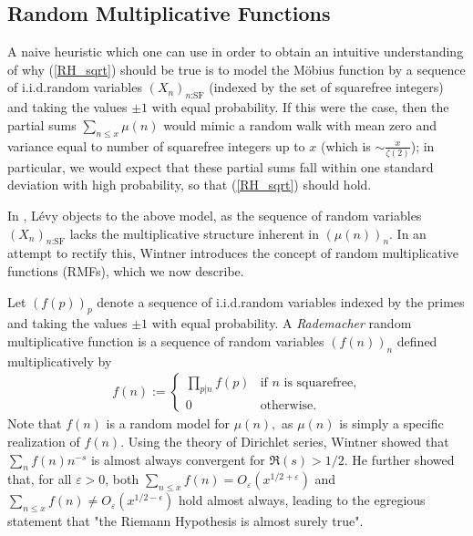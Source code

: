 \documentclass[11pts]{amsart}
\numberwithin{equation}{section}
\begin{document}

\subsection{Random Multiplicative Functions}

A naive heuristic which one can use in order to obtain an intuitive understanding of why (\ref{RH_sqrt}) should be true is to model the M{\"o}bius function by a sequence of i.i.d.\;random variables $(X_n)_{\text{$n$:SF}}$ (indexed by the set of squarefree integers) and taking the values $\pm 1$ with equal probability. If this were the case, then the partial sums $\sum_{n\leq x}\mu(n)$ would mimic a random walk with mean zero and variance equal to number of squarefree integers up to $x$ (which is $\sim \frac{x}{\zeta(2)}$); in particular, we would expect that these partial sums fall within one standard deviation with high probability, so that (\ref{RH_sqrt}) should hold. 

In \cite{Levy}, L{\'e}vy objects to the above model, as the sequence of random variables $(X_n)_{\text{$n$:SF}}$ lacks the multiplicative structure inherent in $(\mu(n))_n$. In an attempt to rectify this, Wintner \cite{Wintner} introduces the concept of {random multiplicative functions} (RMFs), which we now describe.

Let $(f(p))_p$ denote a sequence of i.i.d.\;random variables indexed by the primes and taking the values $\pm 1$ with equal probability. A \textit{Rademacher} random multiplicative function is a sequence of random variables $(f(n))_n$ defined multiplicatively by
\begin{align*}
f(n)
:=
\begin{cases} 
      \prod_{p|n}f(p) & \text{if $n$ is squarefree,} \\
      0 & \text{otherwise}.
   \end{cases}
\end{align*}
Note that $f(n)$ is a random model for $\mu(n),$ as $\mu(n)$ is simply a specific realization of $f(n)$. Using the theory of Dirichlet series, Wintner \cite{Wintner} showed that $\sum_n f(n)n^{-s}$ is almost always convergent for $\Re(s)>1/2.$ He further showed that, for all $\varepsilon>0$, both $\sum_{n\leq x} f(n)= O_\varepsilon( x^{1/2+\varepsilon})$ and $\sum_{n\leq x} f(n)\neq O_\varepsilon (x^{1/2-\epsilon})$ hold almost always, leading to the egregious statement that "the Riemann Hypothesis is almost surely true".
\end{document}
